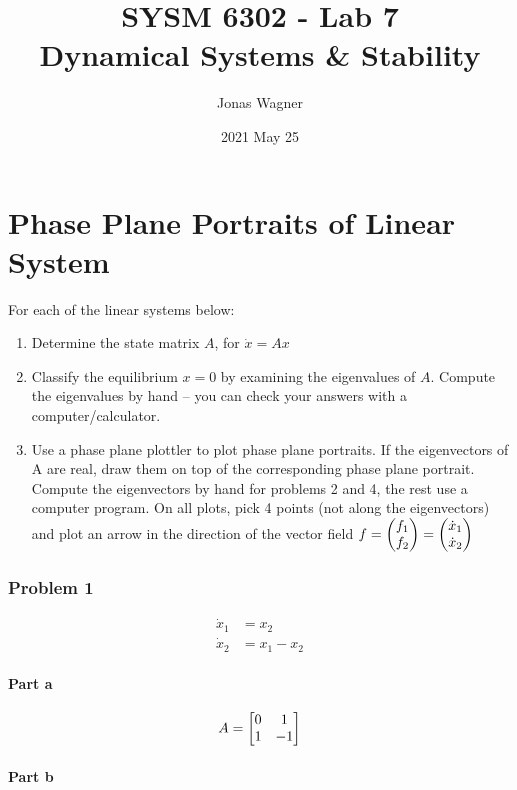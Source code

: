 \documentclass[]{article}
\title{SYSM 6302 - Lab 7\\
Dynamical Systems \& Stability}
\author{Jonas Wagner}
\date{2021 May 25}
\begin{document}
	

\maketitle


\newpage
\setcounter{tocdepth}{1}
\tableofcontents


\newpage
\part{Phase Plane Portraits of Linear System}

For each of the linear systems below:
\begin{enumerate}
	\item Determine the state matrix $A$, for $\dot{x} = A x$
	\item Classify the equilibrium $x = 0$ by examining the eigenvalues of $A$. Compute the eigenvalues by hand – you can check your answers with a computer/calculator.
	\item Use a phase plane plottler to plot phase plane portraits. If the eigenvectors of A are real, draw them on top of the corresponding phase plane portrait. Compute the eigenvectors by hand for problems 2 and 4, the rest use a computer program. On all plots, pick 4 points (not along the eigenvectors) and plot an arrow in the direction of the vector field $f = \mqty(f_1\\ f_2) = \mqty(\dot{x}_1\\ \dot{x}_2)$
\end{enumerate}


\section{Problem 1}
\begin{align*}
	\dot{x}_1 &= x_2\\
	\dot{x}_2 &= x_1 - x_2
\end{align*}

\subsection{Part a}
\begin{displaymath}
	A = \mqty[0&1\\1&-1]
\end{displaymath}

\subsection{Part b}
\end{document}

